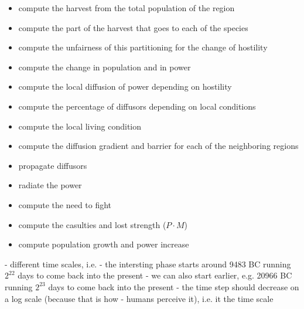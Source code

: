 \documentclass[12pt]{article}
\begin{document}
\begin{itemize}
 \item compute the harvest from the total population of the region
 \item compute the part of the harvest that goes to each of the species
 \item compute the unfairness of this partitioning for the change of hostility
 \item compute the change in population and in power
 \item compute the local diffusion of power depending on hostility
 \item compute the percentage of diffusors depending on local conditions
 \item compute the local living condition
 \item compute the diffusion gradient and barrier for each of the neighboring regions
 \item propagate diffusors
 \item radiate the power
 \item compute the need to fight
 \item compute the casulties and lost strength ($P \cdot M$)
 \item compute population growth and power increase
\end{itemize}


- different time scales, i.e.
- the intersting phase starts around 9483 BC running $2^{22}$ days to come back into the present
- we can also start earlier, e.g. 20966 BC running $2^{23}$ days to come back into the present
- the time step should decrease on a log scale (because that is how
- humans perceive it), i.e. it the time scale 
\end{document}
